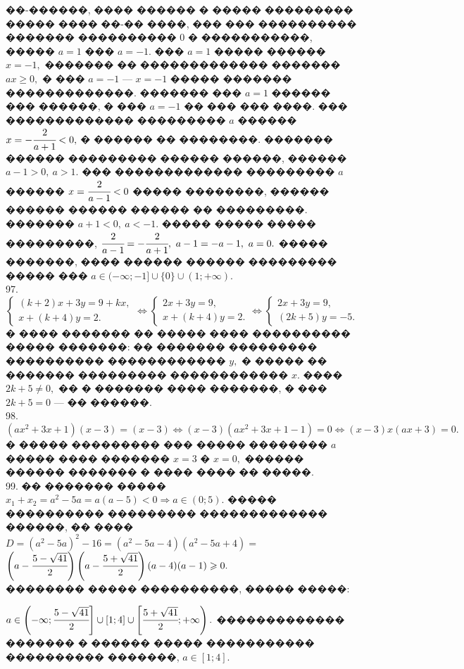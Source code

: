 \documentclass[12pt]{article}
\begin{document}
��-������, ���� ������ � ����� ��������� ����� ���� ��-�� ����, ��� ��� ���������� ������� ���������� 0 � �����������, ����� $a=1$ ��� $a=-1.$ ��� $a=1$ ����� ������ $x=-1,$ ������� �� ������������� ������� $ax\geqslant0,$ � ��� $a=-1$ --- $x=-1$ ����� ������� �������������. ������� ��� $a=1$ ������ ��� ������, � ��� $a=-1$ �� ��� ��� ����. ��� ������������� ��������� $a$ ������ $x=-\cfrac{2}{a+1}<0,$ � ������ �� ��������. ������� ������ ��������� ������ ������, ������ $a-1>0,\ a>1.$ ��� ������������� ��������� $a$ ������ $x=\cfrac{2}{a-1}<0$ ����� ��������, ������ ������ ������ ������ �� ���������. ������� $a+1<0,\ a<-1.$ ����� ����� ����� ���������, $\cfrac{2}{a-1}=-\cfrac{2}{a+1},\ a-1=-a-1,\ a=0.$ ����� �������, ���� ������ ������ ��������� ����� ��� $a\in(-\infty;-1]\cup\{0\}\cup(1;+\infty).$\\
97. $\begin{cases}
(k+2)x+3y=9+kx,\\
x+(k+4)y=2.
\end{cases}\Leftrightarrow\begin{cases}
2x+3y=9,\\
x+(k+4)y=2.
\end{cases}\Leftrightarrow\begin{cases}
2x+3y=9,\\
(2k+5)y=-5.
\end{cases}$
� ���� ������� �� ����� ���� ���������� ����� �������: �� ������� ��������� ���������� ������������ $y,$ � ����� �� ������� ��������� ������������ $x.$ ���� $2k+5\neq0,$ �� � ������� ���� �������, � ��� $2k+5=0$ --- �� ������.\\
98. $(ax^2+3x+1)(x-3)=(x-3)\Leftrightarrow (x-3)(ax^2+3x+1-1)=0\Leftrightarrow (x-3)x(ax+3)=0.$ � ����� ��������� ��� ����� �������� $a$ ����� ���� ������� $x=3$ � $x=0,$ ������ ������ ������� � ���� ���� �� �����.\\
99. �� ������� ����� $x_1+x_2=a^2-5a=a(a-5)<0\Rightarrow a\in(0;5).$ ����� ���������� ��������� ������������� ������, �� ���� $D=(a^2-5a)^2-16=
(a^2-5a-4)(a^2-5a+4)=$\\$\left(a-\cfrac{5-\sqrt{41}}{2}\right)\left(a-\cfrac{5+\sqrt{41}}{2}\right)(a-4)(a-1)\geqslant0.$\\ �������� ����� ����������, ����� �����:
\begin{figure}[ht!]
\end{figure}
$a\in\left(-\infty;\cfrac{5-\sqrt{41}}{2}\right]\cup[1;4]\cup\left[\cfrac{5+\sqrt{41}}{2};+\infty\right).$
������������� ������� � ������ ����� ����������� ���������� �������, $a\in [1;4].$\\
\end{document}
